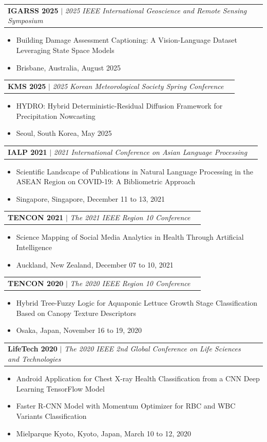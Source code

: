 \documentclass[a4paper,11pt]{article}
\makeatletter
\newcommand{\resumeItem}[1]{
  \item\small{
    {#1 \vspace{-2pt}}
  }
}
\newcommand{\resumeProjectHeading}[2]{
    \item
    \begin{tabular*}{0.97\textwidth}{l@{\extracolsep{\fill}}r}
      \small#1 & #2 \\
    \end{tabular*}\vspace{-7pt}
}
\newcommand{\resumeItemListStart}{\begin{itemize}}
\newcommand{\resumeItemListEnd}{\end{itemize}\vspace{-5pt}}
\makeatother
\begin{document}
      \resumeProjectHeading
          {\textbf{IGARSS 2025} $|$ \emph{2025 IEEE International Geoscience and Remote Sensing Symposium}}{}
          \resumeItemListStart
            \resumeItem{Building Damage Assessment Captioning: A Vision-Language Dataset Leveraging State Space Models}
            \resumeItem{Brisbane, Australia, August 2025}
          \resumeItemListEnd

      \resumeProjectHeading
          {\textbf{KMS 2025} $|$ \emph{2025 Korean Meteorological Society Spring Conference}}{}
          \resumeItemListStart
            \resumeItem{HYDRO: Hybrid Deterministic-Residual Diffusion Framework for Precipitation Nowcasting}
            \resumeItem{Seoul, South Korea, May 2025}
          \resumeItemListEnd

      \resumeProjectHeading
          {\textbf{IALP 2021} $|$ \emph{2021 International Conference on Asian Language Processing}}{}
          \resumeItemListStart
            \resumeItem{Scientific Landscape of Publications in Natural Language Processing in the ASEAN Region on COVID-19: A Bibliometric Approach}
            \resumeItem{Singapore, Singapore, December 11 to 13, 2021}
          \resumeItemListEnd
      \resumeProjectHeading
          {\textbf{TENCON 2021} $|$ \emph{The 2021 IEEE Region 10 Conference}}{}
          \resumeItemListStart
            \resumeItem{Science Mapping of Social Media Analytics in Health Through Artificial Intelligence}
            \resumeItem{Auckland, New Zealand, December 07 to 10, 2021}
          \resumeItemListEnd

        \resumeProjectHeading
          {\textbf{TENCON 2020} $|$ \emph{The 2020 IEEE Region 10 Conference}}{}
          \resumeItemListStart
            \resumeItem{Hybrid Tree-Fuzzy Logic for Aquaponic Lettuce Growth Stage Classification Based on Canopy Texture Descriptors}
            \resumeItem{Osaka, Japan, November 16 to 19, 2020}
          \resumeItemListEnd

        \resumeProjectHeading
          {\textbf{LifeTech 2020} $|$ \emph{The 2020 IEEE 2nd Global Conference on Life Sciences and Technologies}}{}
          \resumeItemListStart
            \resumeItem{Android Application for Chest X-ray Health Classification from a CNN Deep Learning TensorFlow Model}
            \resumeItem{Faster R-CNN Model with Momentum Optimizer for RBC and WBC Variants Classification}
            \resumeItem{Mielparque Kyoto, Kyoto, Japan, March 10 to 12, 2020}
          \resumeItemListEnd
\end{document}
